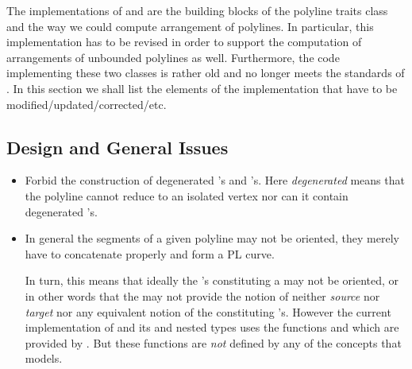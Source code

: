 \documentclass[a4paper,10pt]{article}
\begin{document}
The implementations of \poly and \xpoly are the building blocks of the polyline traits class and the way we could compute arrangement of polylines.
In particular, this implementation has to be revised in order to support the computation of arrangements of unbounded polylines as well.
Furthermore, the code implementing these two classes is rather old and no longer meets the standards of \cgal.
In this section we shall list the elements of the implementation that have to be modified/updated/corrected/etc.

\subsection{Design and General Issues}
\label{sec:design-gener-issu-poly}

\begin{itemize}
\item Forbid the construction of degenerated \poly's and \xpoly's.
  Here \emph{degenerated} means that the polyline cannot reduce to an isolated vertex nor can it contain degenerated \seg's.
\item In general the segments of a given polyline may not be oriented, they merely have to concatenate properly and form a PL curve.
  \begin{center}
  \end{center}
  In turn, this means that ideally the \seg's constituting a \poly may not be oriented, or in other words that the \segtr may not provide the notion of neither \emph{source} nor \emph{target} nor any equivalent notion of the constituting \seg's.
  However the current implementation of \polytr and its \poly and \xpoly nested types uses the functions  and  which are provided by \segtr.
  But these functions are \emph{not} defined by any of the concepts that \segtr models.

\end{itemize}
\end{document}
